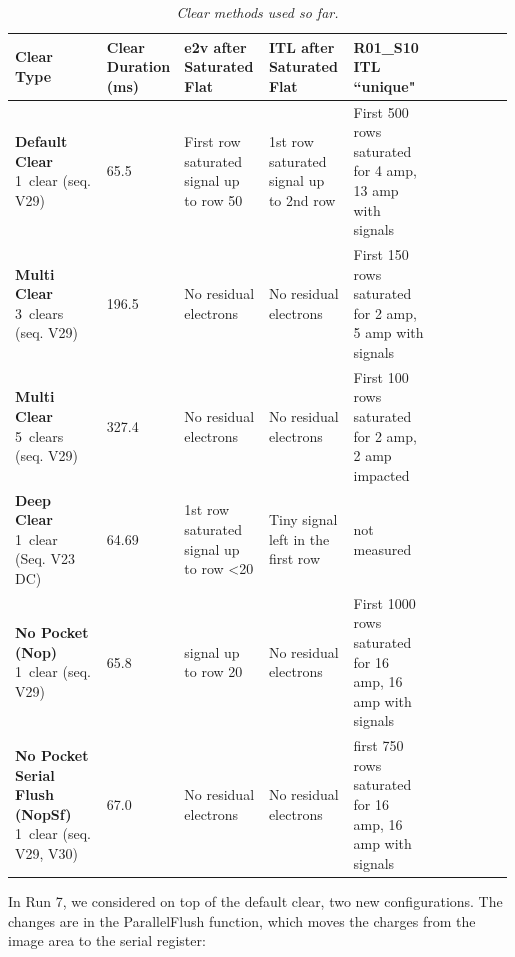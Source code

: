 {\small
\begin{longtable}{|p{0.19\linewidth}|p{0.12\linewidth}|p{0.17\linewidth}|p{0.17\linewidth}|p{0.17\linewidth}|p{0.17\linewidth}|}
\caption{\emph{Clear methods used so far. \label{tab:clears}}} \\
\hline
\textbf{Clear Type} & \textbf{Clear Duration (ms)} & \textbf{e2v after Saturated Flat} & \textbf{ITL after Saturated Flat} & \textbf{R01\_S10 ITL ``unique"} \\
\hline
\endfirsthead

\endhead

\hline
\endfoot

\hline
\endlastfoot

\textbf{Default Clear} 1~clear (seq. V29) & 65.5 & First row saturated signal up to row 50 & 1st row saturated signal up to 2nd row & First 500 rows saturated for 4 amp, 13 amp with signals \\
\textbf{Multi Clear} 3~clears (seq. V29) & 196.5 & No residual electrons & No residual electrons & First 150 rows saturated for 2 amp, 5 amp with signals \\
\textbf{Multi Clear} 5~clears (seq. V29) & 327.4 & No residual electrons & No residual electrons & First 100 rows saturated for 2 amp, 2 amp impacted \\
\textbf{Deep Clear} 1~clear (Seq. V23 DC) & 64.69 & 1st row saturated signal up to row <20 & Tiny signal left in the first row & not measured \\
\textbf{No Pocket (Nop)} 1~clear (seq. V29) & 65.8 & signal up to row 20 & No residual electrons & First 1000 rows saturated for 16 amp, 16 amp with signals \\
\textbf{No Pocket Serial Flush (NopSf)} 1~clear (seq. V29, V30) & 67.0 & No residual electrons & No residual electrons & first 750 rows saturated for 16 amp, 16 amp with signals \\
\end{longtable}
}

In Run 7, we considered on top of the default clear, two new
configurations. The changes are in the ParallelFlush function, which
moves the charges from the image area to the serial register:

